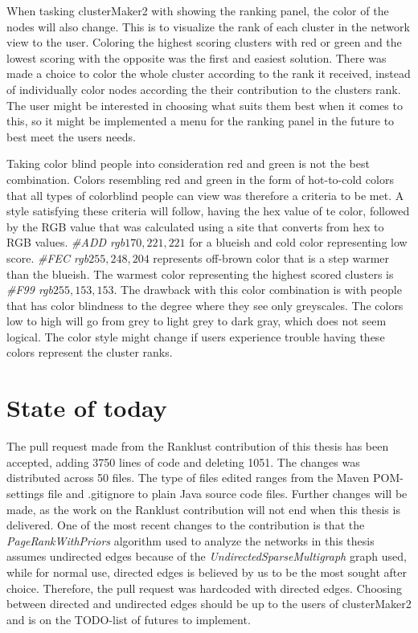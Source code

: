 When tasking clusterMaker2 with showing the ranking panel, the color of the
nodes will also change. This is to visualize the rank of each cluster in the
network view to the user. Coloring the highest scoring clusters with red or
green and the lowest scoring with the opposite was the first and easiest
solution. There was made a choice to color the whole cluster according to the
rank it received, instead of individually color nodes according the their
contribution to the clusters rank. The user might be interested in choosing what
suits them best when it comes to this, so it might be implemented a menu for the
ranking panel in the future to best meet the users needs.

Taking color blind people into consideration red and green is not the
best combination. Colors resembling red and green in the form of hot-to-cold
colors that all types of colorblind people can view was therefore a criteria to
be met. A style satisfying these criteria will follow, having the hex value of
te color\cite{color-blindness3}, followed by the RGB value that was calculated
using a site that converts from hex to RGB values\cite{color-blindness2}.
\textit{\#ADD rgb\(170,221,221\)} for a blueish and cold color representing low
score. \textit{\#FEC rgb\(255,248,204\)} represents off-brown color that is a step
warmer than the blueish. The warmest color representing the highest scored
clusters is \textit{\#F99 rgb\(255,153,153\)}. The drawback with this color
combination is with people that has color blindness to the degree where they see
only greyscales. The colors low to high will go from grey to light grey to dark
gray, which does not seem logical. The color style might change if users
experience trouble having these colors represent the cluster ranks. 

\section{State of today}
The pull request\cite{git-pull-request} made from the Ranklust
contribution of this thesis has been accepted\cite{ranklust-accepted}, adding
3750 lines of code and deleting 1051. The changes was distributed across 50
files. The type of files edited ranges from the Maven POM-settings file and
.gitignore to plain Java source code files. Further changes will be made, as the
work on the Ranklust contribution will not end when this thesis is delivered.
One of the most recent changes to the contribution is that the
\textit{PageRankWithPriors} algorithm used to analyze the networks in this
thesis assumes undirected edges because of the
\textit{UndirectedSparseMultigraph} graph used, while for normal use, directed
edges is believed by us to be the most sought after choice. Therefore, the pull
request was hardcoded with directed edges. Choosing between directed and
undirected edges should be up to the users of clusterMaker2 and is on the
TODO-list of futures to implement.

